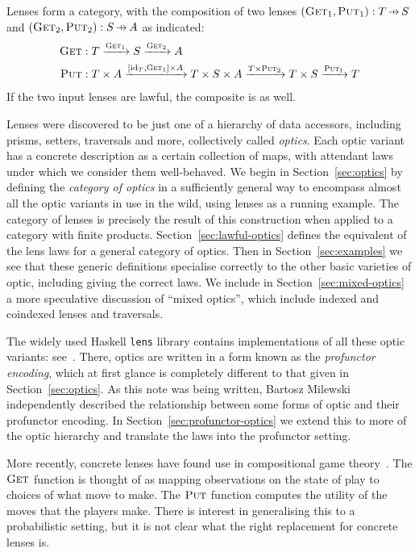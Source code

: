 \documentclass[11pt,letterpaper]{article}
\theoremstyle{plain}
\theoremstyle{definition}
\newcommand{\lenslib}{\texttt{lens}}
\newcommand{\id}{\mathrm{id}}
\newcommand{\fget}{\textsc{Get}}
\newcommand{\fput}{\textsc{Put}}
\newcommand{\hto}{\ensuremath{\,\mathaccent\shortmid\rightarrow\,}}
\begin{document}
Lenses form a category, with the composition of two lenses $(\fget_1, \fput_1) : T \hto S$ and $(\fget_2, \fput_2) : S \hto A$ as indicated:
\begin{align*}
\fget &: T \xrightarrow{\fget_1} S \xrightarrow{\fget_2} A \\
\fput &: T \times A \xrightarrow{[\id_T, \fget_1] \times A} T \times S \times A \xrightarrow{T \times \fput_2} T \times S \xrightarrow{\fput_1} T
\end{align*}
If the two input lenses are lawful, the composite is as well.

Lenses were discovered to be just one of a hierarchy of data accessors, including prisms, setters, traversals and more, collectively called \emph{optics}. Each optic variant has a concrete description as a certain collection of maps, with attendant laws under which we consider them well-behaved. We begin in Section~\ref{sec:optics} by defining the \emph{category of optics} in a sufficiently general way to encompass almost all the optic variants in use in the wild, using lenses as a running example. The category of lenses is precisely the result of this construction when applied to a category with finite products. Section~\ref{sec:lawful-optics} defines the equivalent of the lens laws for a general category of optics. Then in Section~\ref{sec:examples} we see that these generic definitions specialise correctly to the other basic varieties of optic, including giving the correct laws. We include in Section~\ref{sec:mixed-optics} a more speculative discussion of ``mixed optics'', which include indexed and coindexed lenses and traversals.

The widely used Haskell \lenslib{} library contains implementations of all these optic variants: see~\cite{LensLibrary}. There, optics are written in a form known as the \emph{profunctor encoding}, which at first glance is completely different to that given in Section~\ref{sec:optics}. As this note was being written, Bartosz Milewski~\cite{ProfunctorOpticsPost} independently described the relationship between some forms of optic and their profunctor encoding. In Section~\ref{sec:profunctor-optics} we extend this to more of the optic hierarchy and translate the laws into the profunctor setting.

More recently, concrete lenses have found use in compositional game theory~\cite{CompositionalGameTheory}. The $\fget$ function is thought of as mapping observations on the state of play to choices of what move to make. The $\fput$ function computes the utility of the moves that the players make. There is interest in generalising this to a probabilistic setting, but it is not clear what the right replacement for concrete lenses is.
\end{document}
